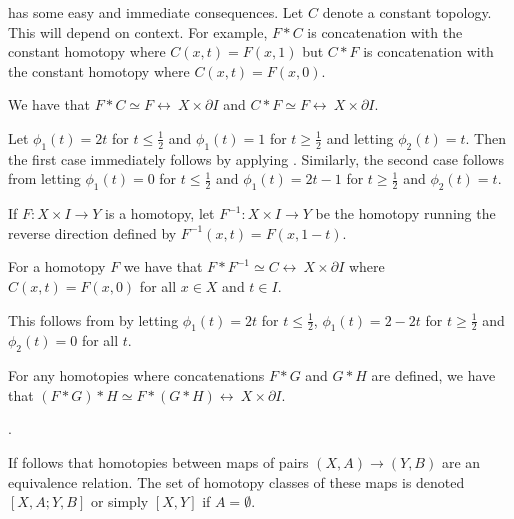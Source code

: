 \documentclass[letterpaper, 11pt, oneside]{book}
\begin{document}
\clearpage

 has some easy and immediate consequences.
Let $C$ denote a constant topology.
This will depend on context.
For example, $F * C$ is concatenation with the constant homotopy where $C(x, t) = F(x, 1)$ but $C * F$ is concatenation with the constant homotopy where $C(x, t) = F(x, 0)$.

\begin{prop}
  We have that $F * C \simeq F \rel\ X \times \partial I$ and $C * F \simeq F \rel\ X \times \partial I$.
\end{prop}
\begin{pf}
  Let $\phi_{1}(t) = 2t$ for $t \leq \frac{1}{2}$ and $\phi_{1}(t) = 1$ for $t \geq \frac{1}{2}$ and letting $\phi_{2}(t) = t$.
  Then the first case immediately follows by applying .
  Similarly, the second case follows from letting $\phi_{1}(t) = 0$ for $t \leq \frac{1}{2}$ and $\phi_{1}(t) = 2t - 1$ for $t \geq \frac{1}{2}$ and $\phi_{2}(t) = t$.
\end{pf}

\begin{defn}
  If $F\colon X \times I \to Y$ is a homotopy, let $F^{-1}\colon X \times I \to Y$ be the homotopy running the reverse direction defined by $F^{-1}(x, t) = F(x, 1 - t)$.
\end{defn}

\begin{prop}
  For a homotopy $F$ we have that $F * F^{-1} \simeq C \rel\ X \times \partial I$ where $C(x, t) = F(x, 0)$ for all $x \in X$ and $t \in I$.
\end{prop}
\begin{pf}
  This follows from  by letting $\phi_{1}(t) = 2t$ for $t \leq \frac{1}{2}$, $\phi_{1}(t) = 2 - 2t$ for $t \geq \frac{1}{2}$ and $\phi_{2}(t) = 0$ for all $t$.
\end{pf}

\begin{prop}
  For any homotopies where concatenations $F * G$ and $G * H$ are defined, we have that $(F * G) * H \simeq F * (G * H) \rel\ X \times \partial I$.
\end{prop}
\begin{pf}
  .
\end{pf}
If follows that homotopies between maps of pairs $(X, A) \to (Y, B)$ are an equivalence relation.
The set of homotopy classes of these maps is denoted $[X, A ; Y, B]$ or simply $[X, Y]$ if $A = \emptyset$.
\end{document}
